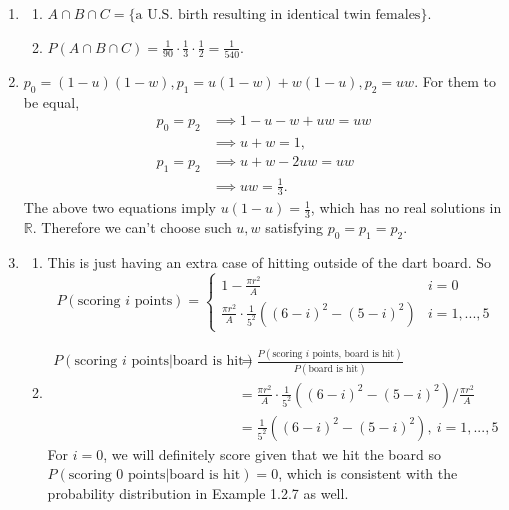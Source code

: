 \documentclass{article}
\begin{document}
\begin{enumerate}
    \item \begin{enumerate}
        \item $A \cap B \cap C = \{ \text{a U.S. birth resulting in identical twin females} \}$.
        \item $P(A \cap B \cap C) = \frac{1}{90} \cdot \frac{1}{3} \cdot \frac{1}{2}
        = \frac{1}{540}$.
    \end{enumerate}

    \item $p_0 = (1 - u)(1 - w), p_1 = u(1 - w) + w(1 - u), p_2 = uw$. For them to be equal,
    \begin{align*}
        p_0 = p_2
        &\implies 1 - u - w + uw = uw \\
        &\implies u + w = 1, \\
        p_1 = p_2
        &\implies u + w - 2uw = uw \\
        &\implies uw = \frac{1}{3}.
    \end{align*}
    The above two equations imply $u(1 - u) = \frac{1}{3}$, which has no real solutions in
    $\mathbb{R}$. Therefore we can't choose such $u, w$ satisfying $p_0 = p_1 = p_2$.
    \item \begin{enumerate}
        \item This is just having an extra case of hitting outside of the dart board. So
        \[ P(\text{scoring } i \text{ points}) = \begin{cases}
            1 - \frac{\pi r^2}{A} & i = 0 \\
            \frac{\pi r^2}{A} \cdot \frac{1}{5^2} ((6 - i)^2 - (5 - i)^2) & i = 1, ..., 5
        \end{cases} \]

        \item \begin{align*}
            P(\text{scoring } i \text{ points}|\text{board is hit})
            &= \frac{P(\text{scoring } i \text{ points, board is hit})}
            {P(\text{board is hit})} \\
            &= \frac{\pi r^2}{A} \cdot \frac{1}{5^2} ((6 - i)^2 - (5 - i)^2)
            / \frac{\pi r^2}{A} \\
            &= \frac{1}{5^2} ((6 - i)^2 - (5 - i)^2), \ i = 1, ..., 5
        \end{align*}
        For $i = 0$, we will definitely score given that we hit the board so \\
        $P(\text{scoring 0 points} | \text{board is hit}) = 0$, which is consistent with the
        probability distribution in Example 1.2.7 as well.
    \end{enumerate}


\end{enumerate}
\end{document}
